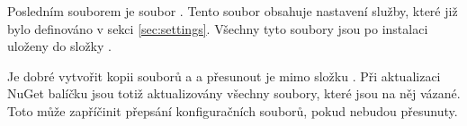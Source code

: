 Posledním souborem je soubor . Tento soubor obsahuje nastavení služby, které již bylo definováno v sekci \ref{sec:settings}. Všechny tyto soubory jsou po instalaci uloženy do složky .

Je dobré vytvořit kopii souborů  a  a přesunout je mimo složku . Při aktualizaci NuGet balíčku jsou totiž aktualizovány všechny soubory, které jsou na něj vázané. Toto může zapříčinit přepsání konfiguračních souborů, pokud nebudou přesunuty. 

